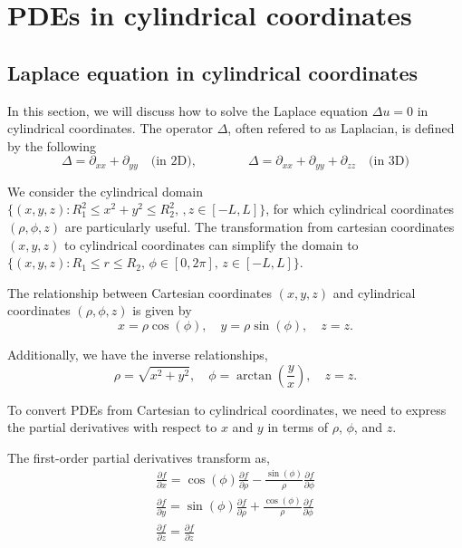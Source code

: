 \section{PDEs in cylindrical coordinates}

\subsection{Laplace equation in cylindrical coordinates}

In this section, we will discuss how to solve the Laplace equation $\Delta u = 0$ in cylindrical coordinates. The operator $\Delta$, often refered to as Laplacian, is defined by the following
\begin{equation}\label{eq.Laplacian}
    \Delta = \partial_{xx} + \partial_{yy} \quad \textrm{(in 2D)},\qquad\qquad \Delta = \partial_{xx} + \partial_{yy} + \partial_{zz} \quad \textrm{(in 3D)}
\end{equation}

We consider the cylindrical domain $\{(x, y, z): R_1^2\le x^2 + y^2 \le R_2^2,\,, z\in [-L, L]\}$, for which cylindrical coordinates \((\rho, \phi, z)\) are particularly useful. The transformation from cartesian coordinates \((x, y, z)\) to cylindrical coordinates can simplify the domain to $\{(x, y, z): R_1\le r \le R_2,\,\phi\in [0, 2\pi],\,z\in [-L, L]\}$.

The relationship between Cartesian coordinates \((x, y, z)\) and cylindrical coordinates \((\rho, \phi, z)\) is given by
\begin{equation}\label{eq.from_cartesian_to_cylindrical}
    x = \rho \cos(\phi), \quad y = \rho \sin(\phi), \quad z = z.
\end{equation}

Additionally, we have the inverse relationships,
\begin{equation}\label{eq.from_cylindrical_to_cartesian}
    \rho = \sqrt{x^2 + y^2}, \quad \phi = \arctan\left(\frac{y}{x}\right), \quad z = z.
\end{equation}

To convert PDEs from Cartesian to cylindrical coordinates, we need to express the partial derivatives with respect to \(x\) and \(y\) in terms of \(\rho\), \(\phi\), and \(z\).

The first-order partial derivatives transform as,
\begin{equation}
    \begin{gathered}
        \frac{\partial f}{\partial x} = \cos(\phi) \frac{\partial f}{\partial \rho} - \frac{\sin(\phi)}{\rho} \frac{\partial f}{\partial \phi}
        \\
        \frac{\partial f}{\partial y} = \sin(\phi) \frac{\partial f}{\partial \rho} + \frac{\cos(\phi)}{\rho} \frac{\partial f}{\partial \phi}
        \\
        \frac{\partial f}{\partial z} = \frac{\partial f}{\partial z}
    \end{gathered}
\end{equation}

